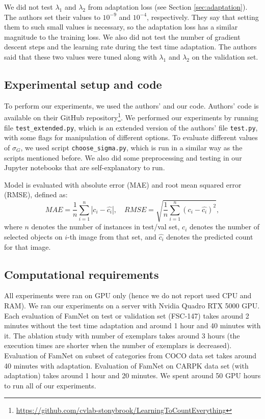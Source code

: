 We did not test $\lambda_1$ and $\lambda_2$ from adaptation loss (see Section \ref{sec:adaptation}). The authors set their values to $10^{-9}$ and $10^{-4}$, respectively. They say that setting them to such small values is necessary, so the adaptation loss has a similar magnitude to the training loss. We also did not test the number of gradient descent steps and the learning rate during the test time adaptation. The authors said that these two values were tuned along with $\lambda_1$ and $\lambda_2$ on the validation set.

\subsection{Experimental setup and code}
To perform our experiments, we used the authors' and our code. Authors' code is available on their GitHub repository\footnote{\url{https://github.com/cvlab-stonybrook/LearningToCountEverything}}. We performed our experiments by running file \texttt{test\_extended.py}, which is an extended version of the authors' file \texttt{test.py}, with some flags for manipulation of different options. To evaluate different values of $\sigma_G$, we used script \texttt{choose\_sigma.py}, which is run in a similar way as the scripts mentioned before. We also did some preprocessing and testing in our Jupyter notebooks that are self-explanatory to run.

Model is evaluated with absolute error (MAE) and root mean squared error (RMSE), defined as:
\begin{equation}
MAE = \frac{1}{n}\sum_{i=1}^n|c_i - \hat{c_i}|, \quad RMSE = \sqrt{\frac{1}{n}\sum_{i=1}^n (c_i - \hat{c_i})^2},
\end{equation}
where $n$ denotes the number of instances in test/val set, $c_i$ denotes the number of selected objects on $i$-th image from that set, and $\hat{c_i}$ denotes the predicted count for that image.

\subsection{Computational requirements}

All experiments were ran on GPU only (hence we do not report used CPU and RAM). We ran our experiments on a server with Nvidia Quadro RTX 5000 GPU. Each evaluation of FamNet on test or validation set (FSC-147) takes around 2 minutes without the test time adaptation and around 1 hour and 40 minutes with it. The ablation study with number of exemplars takes around 3 hours (the execution times are shorter when the number of exemplars is decreased). Evaluation of FamNet on subset of categories from COCO data set takes around 40 minutes with adaptation. Evaluation of FamNet on CARPK data set (with adaptation) takes around 1 hour and 20 minutes. We spent around 50 GPU hours to run all of our experiments.

